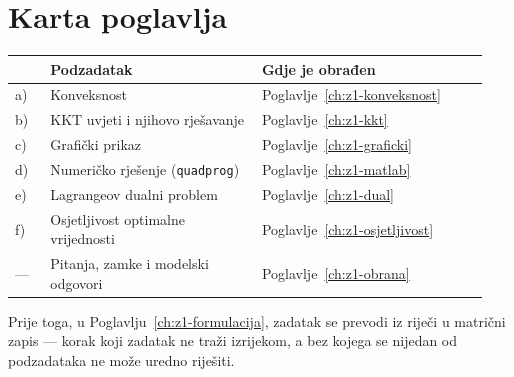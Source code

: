 \section{Karta poglavlja}
\label{sec:z1-karta}

\begin{longtable}{@{}p{0.07\linewidth} p{0.42\linewidth} p{0.45\linewidth}@{}}
\toprule
& \textbf{Podzadatak} & \textbf{Gdje je obrađen} \\
\midrule
\endhead
a) & Konveksnost & Poglavlje~\ref{ch:z1-konveksnost} \\
b) & KKT uvjeti i njihovo rješavanje & Poglavlje~\ref{ch:z1-kkt} \\
c) & Grafički prikaz & Poglavlje~\ref{ch:z1-graficki} \\
d) & Numeričko rješenje (\texttt{quadprog}) & Poglavlje~\ref{ch:z1-matlab} \\
e) & Lagrangeov dualni problem & Poglavlje~\ref{ch:z1-dual} \\
f) & Osjetljivost optimalne vrijednosti & Poglavlje~\ref{ch:z1-osjetljivost} \\
--- & Pitanja, zamke i modelski odgovori & Poglavlje~\ref{ch:z1-obrana} \\
\bottomrule
\end{longtable}

Prije toga, u Poglavlju~\ref{ch:z1-formulacija}, zadatak se prevodi iz riječi u
matrični zapis --- korak koji zadatak ne traži izrijekom, a bez kojega se
nijedan od podzadataka ne može uredno riješiti.
